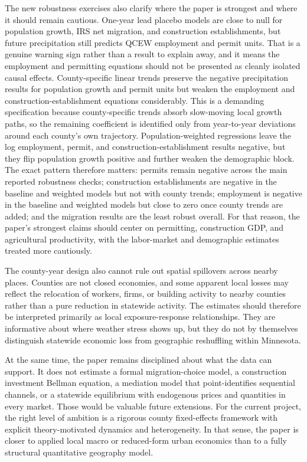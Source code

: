 \documentclass[12pt]{article}
\begin{document}
The new robustness exercises also clarify where the paper is strongest and where it should remain cautious. One-year lead placebo models are close to null for population growth, IRS net migration, and construction establishments, but future precipitation still predicts QCEW employment and permit units. That is a genuine warning sign rather than a result to explain away, and it means the employment and permitting equations should not be presented as cleanly isolated causal effects. County-specific linear trends preserve the negative precipitation results for population growth and permit units but weaken the employment and construction-establishment equations considerably. This is a demanding specification because county-specific trends absorb slow-moving local growth paths, so the remaining coefficient is identified only from year-to-year deviations around each county's own trajectory. Population-weighted regressions leave the log employment, permit, and construction-establishment results negative, but they flip population growth positive and further weaken the demographic block. The exact pattern therefore matters: permits remain negative across the main reported robustness checks; construction establishments are negative in the baseline and weighted models but not with county trends; employment is negative in the baseline and weighted models but close to zero once county trends are added; and the migration results are the least robust overall. For that reason, the paper's strongest claims should center on permitting, construction GDP, and agricultural productivity, with the labor-market and demographic estimates treated more cautiously.

The county-year design also cannot rule out spatial spillovers across nearby places. Counties are not closed economies, and some apparent local losses may reflect the relocation of workers, firms, or building activity to nearby counties rather than a pure reduction in statewide activity. The estimates should therefore be interpreted primarily as local exposure-response relationships. They are informative about where weather stress shows up, but they do not by themselves distinguish statewide economic loss from geographic reshuffling within Minnesota.

At the same time, the paper remains disciplined about what the data can support. It does not estimate a formal migration-choice model, a construction investment Bellman equation, a mediation model that point-identifies sequential channels, or a statewide equilibrium with endogenous prices and quantities in every market. Those would be valuable future extensions. For the current project, the right level of ambition is a rigorous county fixed-effects framework with explicit theory-motivated dynamics and heterogeneity. In that sense, the paper is closer to applied local macro or reduced-form urban economics than to a fully structural quantitative geography model.
\end{document}
